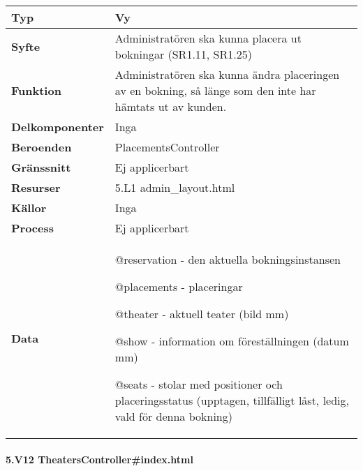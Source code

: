 \documentclass[a4paper, twoside, 11pt, titlepage]{article}
\begin{document}
			\begin {table} [ht] \begin{tabular} {  p{3.5cm} p{11.6cm} }
				\hline
				{\sffamily\textbf{Typ}} & {Vy} \\
				\hline
				{\sffamily\textbf{Syfte}} & {Administratören ska kunna placera ut bokningar (SR1.11, SR1.25)} \\
				\hline
				{\sffamily\textbf{Funktion}} & {Administratören ska kunna ändra placeringen av en bokning, så länge som den inte har hämtats ut av kunden.} \\
				\hline
				{\sffamily\textbf{Delkomponenter}} & {Inga} \\
				\hline
				{\sffamily\textbf{Beroenden}} & {PlacementsController} \\
				\hline
				{\sffamily\textbf{Gränssnitt}} & {Ej applicerbart} \\
				\hline
				{\sffamily\textbf{Resurser}} & {5.L1 admin\_layout.html} \\
				\hline
				{\sffamily\textbf{Källor}} & {Inga} \\
				\hline
				{\sffamily\textbf{Process}} & {Ej applicerbart} \\
				\hline
				{\sffamily\textbf{Data}} & {@reservation - den aktuella bokningsinstansen

@placements - placeringar

@theater - aktuell teater (bild mm)

@show - information om föreställningen (datum mm)

@seats - stolar med positioner och placeringsstatus (upptagen, tillfälligt låst, ledig, vald för denna bokning)} \\
				\hline
			\end{tabular} \end{table} \FloatBarrier


			\clearpage %
			\paragraph{5.V12 TheatersController\#index.html}\
\end{document}
